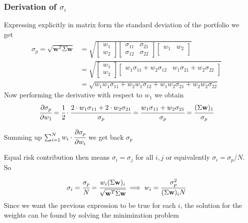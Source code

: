 \begin{attention}
\subsubsection{Derivation of $\sigma_i$}
Expressing explicitly in matrix form the standard deviation of the portfolio we get
\[
\begin{split}
\sigma_p={\sqrt {\mathbf{w}^T\Sigma \mathbf{w}}} & =
\sqrt{
	\begin{bmatrix}
	w_{1} \\
	w_{2}
	\end{bmatrix}
	\begin{bmatrix}
	\sigma_{11} & \sigma_{21} \\
	\sigma_{12} & \sigma_{22}
	\end{bmatrix}
	\begin{bmatrix}
	w_{1} & w_{2} \\
	\end{bmatrix}
}\\
&=
\sqrt{
	\begin{bmatrix}
	w_{1} \\
	w_{2}
	\end{bmatrix}
	\begin{bmatrix}
w_{1}\sigma_{11} + w_{2}\sigma_{12} & w_{1}\sigma_{21} + w_{2}\sigma_{22} \\
	\end{bmatrix}
} \\
&= \sqrt{
w_{1}w_{1}\sigma_{11} + w_{2}w_{1}\sigma_{12} + w_{1}w_{2}\sigma_{21} + w_{2}w_{2}\sigma_{22} }
\end{split}
\]
Now performing the derivative with respect to $w_1$ we obtain
\[\cfrac{\partial\sigma_p}{\partial w_1} = \cfrac{1}{2}\cdot\cfrac{2\cdot w_1\sigma_{11} + 2\cdot w_{2}\sigma_{21}}{\sigma_p} = \cfrac{w_1\sigma_{11} + w_{2}\sigma_{21}}{\sigma_p} = \cfrac{(\Sigma \mathbf{w})_{1}}{\sigma_p}\]

Summing up $\sum_{i=1}^{N} w_i\cdot\cfrac{\partial\sigma_p}{\partial w_i}$ we get back $\sigma_p$
\end{attention}

Equal risk contribution then means \(\sigma _{i} =\sigma _{j}\) for all \(i,j\) or equivalently \(\sigma _{i}=\sigma_p/N\). So

\begin{equation}
\sigma _{i} = \cfrac{\sigma_p}{N}={\cfrac {w_{i}(\Sigma \mathbf{w})_{i}}{\sqrt {\mathbf{w}^T\Sigma \mathbf{w}}}}\implies w_{i} = \frac {\sigma_p^{2}}{(\Sigma \mathbf{w})_{i}N}
\label{eq:risk_parity_weights}
\end{equation}
Since we want the previous expression to be true for each $i$, the solution for the weights can be found by solving the minimization problem

